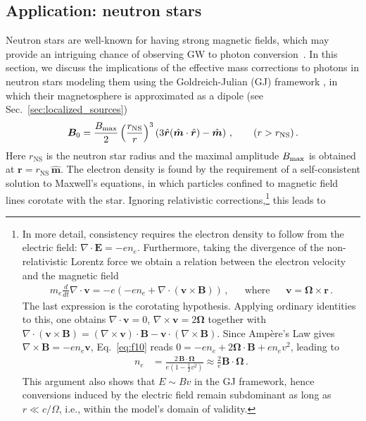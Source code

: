 \documentclass[a4paper,11pt]{article}
\begin{document}
\subsection{Application:  neutron stars
}

\label{sec:neutron_star}


Neutron stars are well-known for having strong magnetic fields, which may provide an intriguing chance of observing GW to photon conversion~\cite{Ito:2023fcr, Ito:2023nkq, Dandoy:2024oqg, McDonald:2024nxj}.
%
In this section, we discuss the implications of the effective mass corrections to photons in neutron stars modeling them using  the Goldreich-Julian (GJ) framework \cite{Goldreich:1969sb}, in which  their magnetosphere is approximated as a dipole (see Sec.~\ref{sec:localized_sources})
%
\begin{align}
    \bm{B}_{0} = \frac{B_{\rm max}}{2} \left(  \frac{r_{\rm NS}}{r} \right)^{3} \left( 3 \hat{\bm{r}} ( \hat{\bm{m}} \cdot \hat{\bm{r}} ) - \hat{\bm{m}}  \right)\,, \qquad (r > r_{\rm NS} )\,.
\end{align}
Here $r_\text{NS}$ is the neutron star radius and the maximal amplitude $B_{\rm max}$ is obtained at ${\bm r} = r_\text{NS} \, \hat{\bm m}$.
%
The electron density is found by the requirement of a self-consistent solution to Maxwell’s equations, in which particles confined to magnetic field lines corotate with the star. Ignoring relativistic corrections,\footnote{
%
In more detail, consistency requires the electron density to follow from the electric field: $\nabla \cdot \mathbf{E} =-en_e $. Furthermore, taking the divergence of the non-relativistic Lorentz force we obtain a relation between the electron velocity and the magnetic field
    \begin{align}    \label{eq:f10}
    m_e  \frac{d}{dt}\nabla \cdot \mathbf{v}= -e (-e n_e +\nabla \cdot(\mathbf{v} \times \mathbf{B}))\,,&&\text{where}&& \mathbf{v} = \boldsymbol{\Omega} \times \mathbf{r}\,.
    \end{align}
%
The last expression is  the corotating hypothesis. Applying ordinary identities to this, one obtains  $\nabla \cdot \mathbf{v} =0 $, $\nabla  \times \mathbf{v} = 2 \mathbf{\Omega} $ together with  $\nabla \cdot(\mathbf{v} \times \mathbf{B}) =  ( \nabla  \times \mathbf{v}) \cdot \mathbf{B} -\mathbf{v} \cdot ( \nabla  \times \mathbf{B})$. Since Ampère's Law gives  $\nabla  \times \mathbf{B} = -e n_e \mathbf{v}$, Eq.~\eqref{eq:f10} reads $ 0 = -e n_e +2 \mathbf{\Omega}\cdot \mathbf{B}+ e n_e v^2$, leading to
%
\begin{align}    
     n_e &= \frac{2\, \mathbf{B} \cdot \boldsymbol{\Omega}}{e \left(1 - \frac{1}{2} v^2\right) } \approx  \frac{2}{e } \mathbf{B} \cdot \boldsymbol{\Omega} \,.
\end{align}
%
This argument also shows that $E \sim B v$ in the GJ framework, hence conversions induced by the electric field remain subdominant as long as $r \ll c/\Omega$, i.e., within the model’s domain of validity.
} this leads to
\end{document}
